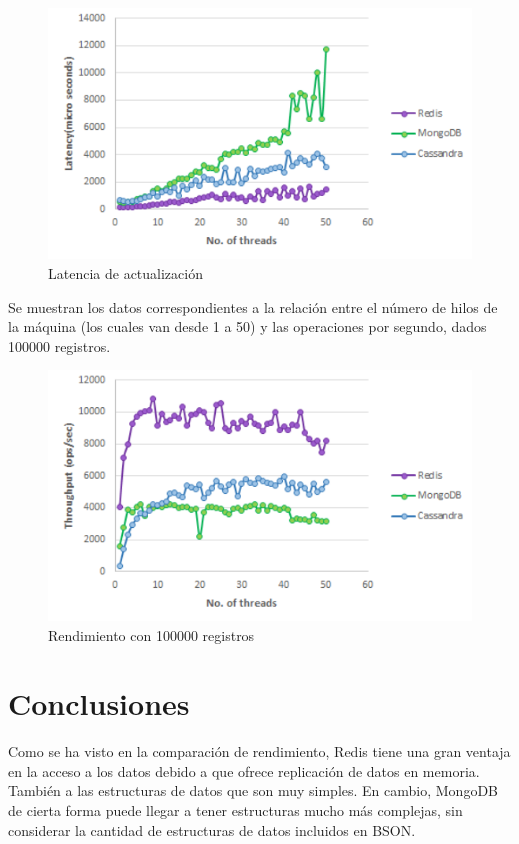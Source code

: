 \documentclass[twocolumn]{article}
\begin{document}
\begin{figure}[H]
  \includegraphics[width = \columnwidth]{img/07_g5.png}
  \caption{Latencia de actualización}
\end{figure}

Se muestran los datos correspondientes a la relación entre el número de hilos de la máquina (los cuales van desde 1 a 50) y las operaciones por segundo, dados 100000 registros.

\begin{figure}[H]
  \includegraphics[width = \columnwidth]{img/08_g6.png}
  \caption{Rendimiento con 100000 registros}
\end{figure}

\section{Conclusiones}

Como se ha visto en la comparación de rendimiento, Redis tiene una gran ventaja en la acceso a los datos debido a que ofrece replicación de datos en memoria. También a las estructuras de datos que son muy simples. En cambio, MongoDB de cierta forma puede llegar a tener estructuras mucho más complejas, sin considerar la cantidad de estructuras de datos incluidos en BSON.
\end{document}
